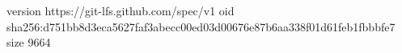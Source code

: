 version https://git-lfs.github.com/spec/v1
oid sha256:d751bb8d3eca5627faf3abecc00ed03d00676e87b6aa338f01d61feb1fbbbfe7
size 9664
